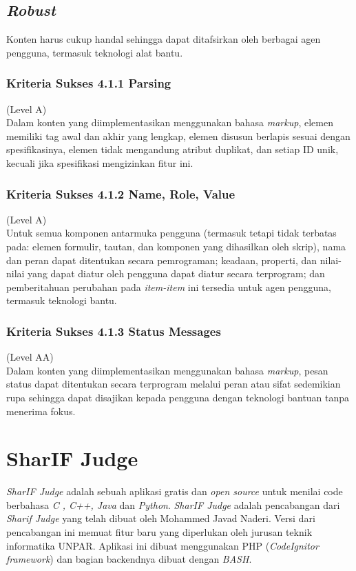 \subsection{\textit{Robust}}
\label{subsec:robust}
Konten harus cukup handal sehingga dapat ditafsirkan oleh berbagai agen pengguna, termasuk teknologi alat bantu.

\subsubsection{Kriteria Sukses 4.1.1 Parsing}
\label{subsubsec:kriteria_4.1.1}
(Level A) \\

Dalam konten yang diimplementasikan menggunakan bahasa \textit{markup}, elemen memiliki tag awal dan akhir yang lengkap, elemen disusun berlapis sesuai dengan spesifikasinya, elemen tidak mengandung atribut duplikat, dan setiap ID unik, kecuali jika spesifikasi mengizinkan fitur ini.

\subsubsection{Kriteria Sukses 4.1.2 Name, Role, Value}
\label{subsubsec:kriteria_4.1.2}
(Level A) \\

Untuk semua komponen antarmuka pengguna (termasuk tetapi tidak terbatas pada: elemen formulir, tautan, dan komponen yang dihasilkan oleh skrip), nama dan peran dapat ditentukan secara pemrograman; keadaan, properti, dan nilai-nilai yang dapat diatur oleh pengguna dapat diatur secara terprogram; dan pemberitahuan perubahan pada \textit{item-item} ini tersedia untuk agen pengguna, termasuk teknologi bantu.

\subsubsection{Kriteria Sukses 4.1.3 Status Messages}
\label{subsubsec:kriteria_4.1.3}
(Level AA) \\

Dalam konten yang diimplementasikan menggunakan bahasa \textit{markup}, pesan status dapat ditentukan secara terprogram melalui peran atau sifat sedemikian rupa sehingga dapat disajikan kepada pengguna dengan teknologi bantuan tanpa menerima fokus.

\section{SharIF Judge}
\label{sec:SharIF_Judge}
\textit{SharIF Judge} adalah sebuah aplikasi gratis dan \textit{open source} untuk menilai code berbahasa \textit{C , C++, Java} dan \textit{Python}. \textit{SharIF Judge} adalah pencabangan dari \textit{Sharif Judge} yang telah dibuat oleh Mohammed Javad Naderi. Versi dari pencabangan ini memuat fitur baru yang diperlukan oleh jurusan teknik informatika UNPAR. Aplikasi ini dibuat menggunakan PHP (\textit{CodeIgnitor framework}) dan bagian backendnya dibuat dengan \textit{BASH}.

